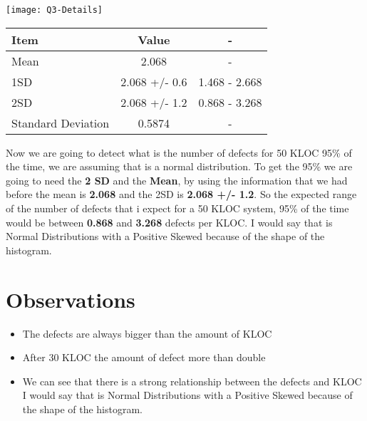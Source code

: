 \begin{center}
    \texttt{[image: Q3-Details]}    
\end{center}

\noindent

\begin{center}
    \begin{tabular}{|p{4cm} | c | c|}
        \hline
        Item & Value & - \\ [0.5ex] 
        \hline
        Mean & 2.068 & -  \\  
        \hline
        1SD & 2.068 +/- 0.6 & 1.468 - 2.668 \\
        \hline
        2SD & 2.068 +/- 1.2 & 0.868 - 3.268 \\
        \hline
        Standard Deviation & 0.5874 & -\\
        \hline
    \end{tabular}
\end{center}

\noindent\newline \newline
Now we are going to detect what is the number of defects for 50 KLOC 95\% of the time, we are assuming that is a normal distribution.
\noindent\newline \newline
To get the 95\% we are going to need the \textbf{2 SD} and the \textbf{Mean}, by using the information that we had before the mean is \textbf{2.068} and the 2SD is \textbf{2.068 +/- 1.2}. So the expected range of the number of defects that i expect for a 50 KLOC system, 95\% of the time would be between \textbf{0.868} and \textbf{3.268} defects per KLOC.
\noindent\newline \newline
I would say that is Normal Distributions with a Positive Skewed because of the shape of the histogram.

\pagebreak

\section{Observations}
\begin{itemize}
    \item The defects are always bigger than the amount of KLOC 
    \item After 30 KLOC the amount of defect more than double
    \item We can see that there is a strong relationship between the defects and KLOC I would say that is Normal Distributions with a Positive Skewed because of the shape of the histogram.
\end{itemize}
\pagebreak

